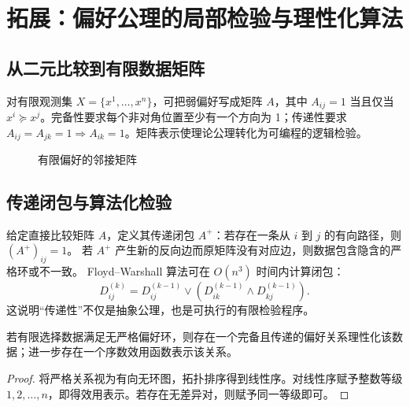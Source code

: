 \clearpage
\section{拓展：偏好公理的局部检验与理性化算法}

\subsection{从二元比较到有限数据矩阵}
对有限观测集 $X=\{x^1,\ldots,x^n\}$，可把弱偏好写成矩阵 $A$，其中
$A_{ij}=1$ 当且仅当 $x^i\succeq x^j$。完备性要求每个非对角位置至少有一个方向为 1；传递性要求
$A_{ij}=A_{jk}=1\Rightarrow A_{ik}=1$。矩阵表示使理论公理转化为可编程的逻辑检验。

\begin{figure}[H]\centering
{}
\caption{有限偏好的邻接矩阵}
\end{figure}

\subsection{传递闭包与算法化检验}
给定直接比较矩阵 $A$，定义其传递闭包 $A^+$：若存在一条从 $i$ 到 $j$ 的有向路径，则 $(A^+)_{ij}=1$。
若 $A^+$ 产生新的反向边而原矩阵没有对应边，则数据包含隐含的严格环或不一致。
Floyd--Warshall 算法可在 $O(n^3)$ 时间内计算闭包：
\[
D^{(k)}_{ij}=D^{(k-1)}_{ij}\lor
(D^{(k-1)}_{ik}\land D^{(k-1)}_{kj}).
\]
这说明“传递性”不仅是抽象公理，也是可执行的有限检验程序。

\begin{proposition}[有限集上的理性化]
若有限选择数据满足无严格偏好环，则存在一个完备且传递的偏好关系理性化该数据；进一步存在一个序数效用函数表示该关系。
\end{proposition}
\begin{proof}
将严格关系视为有向无环图，拓扑排序得到线性序。对线性序赋予整数等级 $1,2,\ldots,n$，即得效用表示。若存在无差异对，则赋予同一等级即可。
\end{proof}

